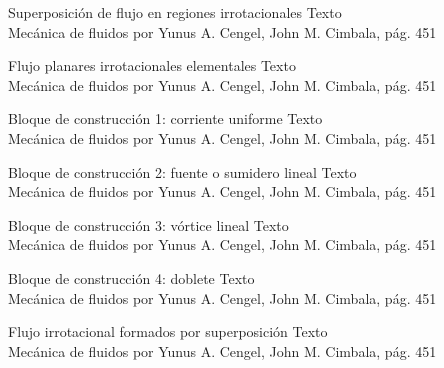 
\begin{frame}{Superposición de flujo en regiones irrotacionales}
\justifying
Texto
\\
{\tiny Mecánica de fluidos por Yunus A. Cengel, John M. Cimbala, pág. 451}
\end{frame}


\begin{frame}{Flujo planares irrotacionales elementales}
\justifying
Texto
\\
{\tiny Mecánica de fluidos por Yunus A. Cengel, John M. Cimbala, pág. 451}
\end{frame}


\begin{frame}{Bloque de construcción 1: corriente uniforme}
\justifying
Texto
\\
{\tiny Mecánica de fluidos por Yunus A. Cengel, John M. Cimbala, pág. 451}
\end{frame}


\begin{frame}{Bloque de construcción 2: fuente o sumidero lineal}
\justifying
Texto
\\
{\tiny Mecánica de fluidos por Yunus A. Cengel, John M. Cimbala, pág. 451}
\end{frame}


\begin{frame}{Bloque de construcción 3: vórtice lineal}
\justifying
Texto
\\
{\tiny Mecánica de fluidos por Yunus A. Cengel, John M. Cimbala, pág. 451}
\end{frame}


\begin{frame}{Bloque de construcción 4: doblete}
\justifying
Texto
\\
{\tiny Mecánica de fluidos por Yunus A. Cengel, John M. Cimbala, pág. 451}
\end{frame}


\begin{frame}{Flujo irrotacional formados por superposición}
\justifying
Texto
\\
{\tiny Mecánica de fluidos por Yunus A. Cengel, John M. Cimbala, pág. 451}
\end{frame}

